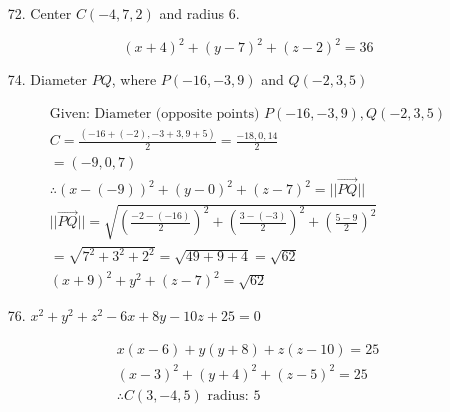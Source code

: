 \documentclass[10pt, letterpaper]{article}
\begin{document}
\begin{itemize}
        \item [72.] Center $C(-4, 7, 2)$ and radius 6.
        
        \begin{mdframed}
            \begin{equation*}
                (x+4)^{2} + (y-7)^{2} + (z-2)^{2} = 36
            \end{equation*}
        \end{mdframed}

        \item [74.] Diameter $PQ$, where $P(-16, -3, 9)$ and $Q(-2, 3, 5)$
        
        \begin{mdframed}
            \begin{equation*}
                \begin{gathered}
                    \text{Given: Diameter (opposite points) } P(-16, -3, 9), Q(-2, 3, 5)    \\
                    C = \frac{(-16 + (-2), -3 + 3, 9 + 5)}{2} = \frac{-18, 0, 14}{2}        \\
                      = (-9, 0, 7)                                                          \\
                    \therefore (x - (-9))^{2} + (y - 0)^{2} + (z - 7)^{2} = ||\vec{PQ}||    \\
                    ||\vec{PQ}|| = \sqrt{
                        \left(\frac{-2 - (-16)}{2}\right)^{2} +
                        \left(\frac{3 - (-3)}{2}\right)^{2} +
                        \left(\frac{5 - 9}{2}\right)^{2}
                    }   \\
                    = \sqrt{7^2 + 3^2 + 2^2} = \sqrt{49 + 9 + 4} = \sqrt{62}                \\
                    \boxed{(x + 9)^{2} + y^{2} + (z - 7)^{2} = \sqrt{62}}
                \end{gathered}
            \end{equation*}
        \end{mdframed}

        \item [76.] $x^2 + y^2 + z^2 - 6x + 8y - 10z + 25 = 0$
        
        \begin{mdframed}
            \begin{equation*}
                \begin{gathered}
                    x(x-6)+y(y+8)+z(z-10) = 25          \\
                    (x-3)^{2}+(y+4)^{2}+(z-5)^{2} = 25  \\
                    \therefore \boxed{C(3, -4, 5) \text{ radius: } 5}
                \end{gathered}
            \end{equation*}
        \end{mdframed}


\end{itemize}
\end{document}
